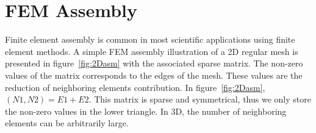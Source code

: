 \documentclass[10pt]{IOS-Book-Article}
\begin{document}
\section{FEM Assembly}

Finite element assembly is common in most scientific applications using finite element methods.
A simple FEM assembly illustration of a 2D regular mesh is presented in figure~\ref{fig:2Dasm} with the associated sparse matrix.
The non-zero values of the matrix corresponds to the edges of the mesh. These values are the reduction of neighboring elements contribution. In figure~\ref{fig:2Dasm}, $(N1,N2) = E1 + E2$.
This matrix is sparse and symmetrical, thus we only store the non-zero values in the lower triangle.
In 3D, the number of neighboring elements can be arbitrarily large.
\end{document}
